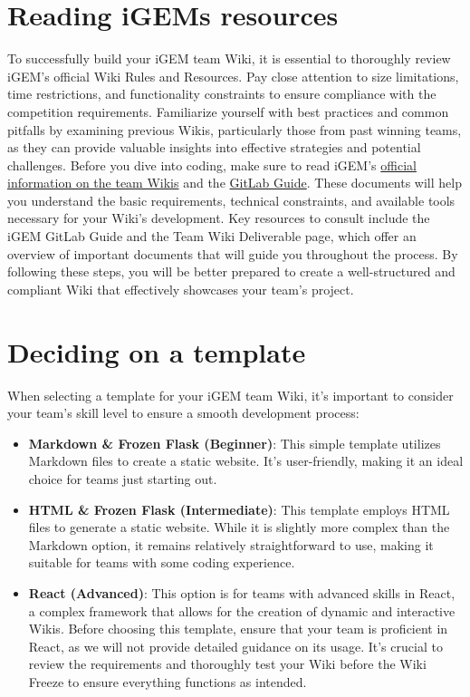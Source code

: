 
    \section{Reading iGEMs resources} \label{sec:reading-igem-resources}
    To successfully build your iGEM team Wiki, it is essential to thoroughly review iGEM’s official Wiki Rules and Resources. 
    Pay close attention to size limitations, time restrictions, and functionality constraints to ensure compliance with the competition requirements. 
    Familiarize yourself with best practices and common pitfalls by examining previous Wikis, particularly those from past winning teams, as they can provide valuable insights into effective strategies and potential challenges. \newline
    Before you dive into coding, make sure to read iGEM’s \href{https://competition.igem.org/deliverables/team-Wiki}{official information on the team Wikis} and the \href{https://competition.igem.org/deliverables/gitlab-guide}{GitLab Guide}.
    These documents will help you understand the basic requirements, technical constraints, and available tools necessary for your Wiki's development. 
    Key resources to consult include the iGEM GitLab Guide and the Team Wiki Deliverable page, which offer an overview of important documents that will guide you throughout the process. \newline
    By following these steps, you will be better prepared to create a well-structured and compliant Wiki that effectively showcases your team’s project.


    \section{Deciding on a template } \label{sec:template-decision}
    When selecting a template for your iGEM team Wiki, it’s important to consider your team’s skill level to ensure a smooth development process:

    \begin{itemize}
        \item \textbf{Markdown \& Frozen Flask (Beginner)}: This simple template utilizes Markdown files to create a static website. 
        It's user-friendly, making it an ideal choice for teams just starting out.
        \item \textbf{HTML \& Frozen Flask (Intermediate)}: This template employs HTML files to generate a static website. 
        While it is slightly more complex than the Markdown option, it remains relatively straightforward to use, making it suitable for teams with some coding experience.
        \item \textbf{React (Advanced)}: This option is for teams with advanced skills in React, a complex framework that allows for the creation of dynamic and interactive Wikis. 
        Before choosing this template, ensure that your team is proficient in React, as we will not provide detailed guidance on its usage.
        It’s crucial to review the requirements and thoroughly test your Wiki before the Wiki Freeze to ensure everything functions as intended.
    \end{itemize}


